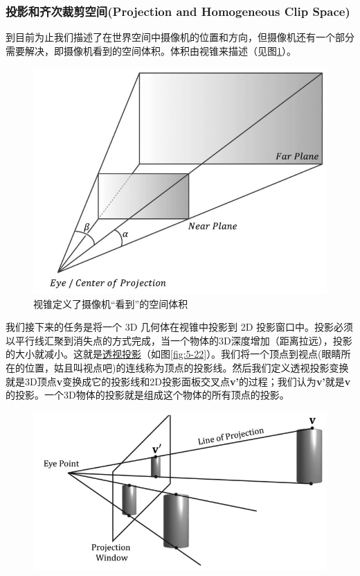 \documentclass[11pt,a4paper,oldfontcommands]{memoir}
\begin{document}
{\subsubsection{投影和齐次裁剪空间(Projection and Homogeneous Clip Space)}
\begin{flushleft}
到目前为止我们描述了在世界空间中摄像机的位置和方向，但摄像机还有一个部分需要解决，即摄像机看到的空间体积。体积由视锥来描述（见图\ref{fig:5-21}）。
\end{flushleft}
\begin{figure}[t]
    \includegraphics[width=\textwidth]{5-21}
    \centering
    \caption{视锥定义了摄像机“看到”的空间体积}
    \label{fig:5-21}
\end{figure}
\begin{flushleft}
我们接下来的任务是将一个 3D 几何体在视锥中投影到 2D 投影窗口中。投影必须以平行线汇聚到消失点的方式完成，当一个物体的3D深度增加（距离拉远），投影的大小就减小。这就是\href{https://en.wikipedia.org/wiki/Perspective_(graphical)}{\textcolor{linkColor}{透视投影}}（如图\ref{fig:5-22}）。我们将一个顶点到视点(眼睛所在的位置，姑且叫视点吧)的连线称为顶点的投影线。然后我们定义透视投影变换就是3D顶点\textbf{v}变换成它的投影线和2D投影面板交叉点\textbf{v'}的过程；我们认为\textbf{v'}就是\textbf{v}的投影。一个3D物体的投影就是组成这个物体的所有顶点的投影。
\end{flushleft}
\begin{figure}[t]
    \includegraphics[width=\textwidth]{5-22}

\end{figure}}
\end{document}
